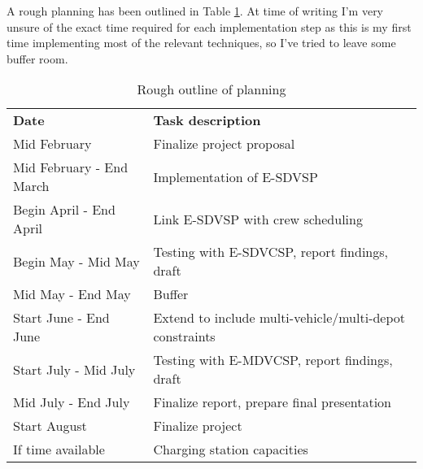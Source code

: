 \documentclass[]{article}
\begin{document}
A rough planning has been outlined in Table \ref{tab:planning}. At time of writing I'm very unsure of the exact time required for each implementation step as this is my first time implementing most of the relevant techniques, so I've tried to leave some buffer room.
\begin{table}[h]
  \centering
  \begin{tabular}{ll}
    \toprule
    \multicolumn{1}{l}{\textbf{Date}} & \multicolumn{1}{l}{\textbf{Task description}}               \\
    \cmidrule(lr){1-1}\cmidrule(lr){2-2}
    Mid February & Finalize project proposal \\
    Mid February - End March & Implementation of E-SDVSP \\
    Begin April - End April & Link E-SDVSP with crew scheduling \\ 
    Begin May - Mid May & Testing with E-SDVCSP, report findings, draft \\
    Mid May - End May & Buffer \\ 
    Start June - End June & Extend to include multi-vehicle/multi-depot constraints \\
    Start July - Mid July & Testing with E-MDVCSP, report findings, draft \\ 
    Mid July - End July & Finalize report, prepare final presentation \\ 
    Start August & Finalize project \\
    If time available & Charging station capacities \\
    \bottomrule
  \end{tabular}
  \label{tab:planning}
  \caption{Rough outline of planning}
\end{table}

\printbibliography
\end{document}
